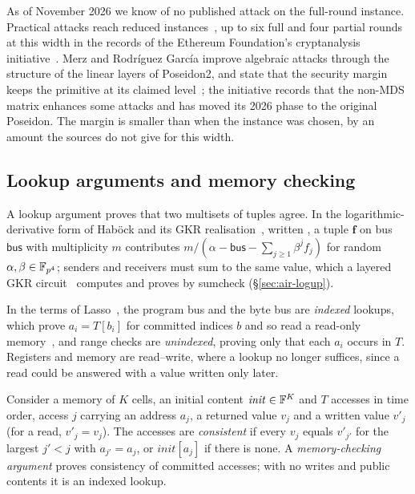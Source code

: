 As of November 2026 we know of no published attack on the full-round instance. Practical attacks reach reduced instances~\citep{bbbhj26}, up to six full and four partial rounds at this width in the records of the Ethereum Foundation's cryptanalysis initiative~\citep{poseidon-initiative}. Merz and Rodr\'iguez Garc\'ia improve algebraic attacks through the structure of the linear layers of Poseidon2, and state that the security margin keeps the primitive at its claimed level~\citep{merz-rodriguez26}; the initiative records that the non-MDS matrix enhances some attacks and has moved its 2026 phase to the original Poseidon. The margin is smaller than when the instance was chosen, by an amount the sources do not give for this width.

\subsection{Lookup arguments and memory checking}
\label{sec:prelim-lookups}

A lookup argument proves that two multisets of tuples agree. In the logarithmic-derivative form of Hab\"ock and its GKR realisation~\citep{haboeck,logup-gkr}, written \LogUp{}, a tuple $\bm f$ on bus $\mathsf{bus}$ with multiplicity $m$ contributes $m/(\alpha - \mathsf{bus} - \sum_{j \ge 1} \beta^{j} f_j)$ for random $\alpha, \beta \in \mathbb{F}_{p^4}$; senders and receivers must sum to the same value, which a layered GKR circuit~\citep{gkr-cmt} computes and proves by sumcheck (\S\ref{sec:air-logup}).

In the terms of Lasso~\citep{lasso}, the program bus and the byte bus are \emph{indexed} lookups, which prove $a_i = T[b_i]$ for committed indices $b$ and so read a read-only memory~\citep{twist-shout}, and range checks are \emph{unindexed}, proving only that each $a_i$ occurs in $T$. Registers and memory are read--write, where a lookup no longer suffices, since a read could be answered with a value written only later.

\begin{definition}
\label{def:memcheck}
Consider a memory of $K$ cells, an initial content $\mathit{init} \in \mathbb{F}^{K}$ and $T$ accesses in time order, access $j$ carrying an address $a_j$, a returned value $v_j$ and a written value $v'_j$ (for a read, $v'_j = v_j$). The accesses are \emph{consistent} if every $v_j$ equals $v'_{j'}$ for the largest $j' < j$ with $a_{j'} = a_j$, or $\mathit{init}[a_j]$ if there is none. A \emph{memory-checking argument} proves consistency of committed accesses; with no writes and public contents it is an indexed lookup.
\end{definition}

